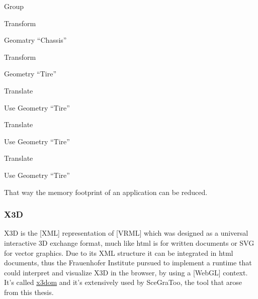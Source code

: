 \begin{itemize*}
  \item Group
  \begin{itemize*}
    \item Transform
    \begin{itemize*}
      \item Geomatry ``Chassis''
    \end{itemize*}
    \item Transform
    \begin{itemize*}
      \item Geometry ``Tire''
    \end{itemize*}
    \item Translate
    \begin{itemize*}
      \item Use Geometry ``Tire''
    \end{itemize*}
    \item Translate
    \begin{itemize*}
      \item Use Geometry ``Tire''
    \end{itemize*}
    \item Translate
    \begin{itemize*}
      \item Use Geometry ``Tire''
    \end{itemize*}
  \end{itemize*}
\end{itemize*}

That way the memory footprint of an application can be reduced.

\subsubsection{X3D}\label{x3d}

X3D is the {[}XML{]} representation of {[}VRML{]} which was designed as
a universal interactive 3D exchange format, much like html is for
written documents or SVG for vector graphics. Due to its XML structure
it can be integrated in html documents, thus the Frauenhofer Institute
pursued to implement a runtime that could interpret and visualize X3D in
the browser, by using a {[}WebGL{]} context. It's called
\href{http://www.x3dom.org/}{x3dom} and it's extensively used by
SceGraToo, the tool that arose from this thesis.


